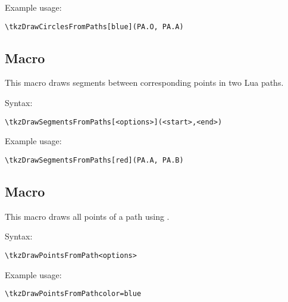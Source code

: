 \noindent
Example usage:

\begin{mybox}
\begin{verbatim}
\tkzDrawCirclesFromPaths[blue](PA.O, PA.A)
\end{verbatim}
\end{mybox}


\subsection{Macro } %
\label{sub:macro_tkzDrawSegmentsFromPaths}

This macro draws segments between corresponding points in two Lua paths.

\medskip
\noindent
Syntax:

\begin{verbatim}
\tkzDrawSegmentsFromPaths[<options>](<start>,<end>)
\end{verbatim}

\noindent
Example usage:

\begin{mybox}
\begin{verbatim}
\tkzDrawSegmentsFromPaths[red](PA.A, PA.B)
\end{verbatim}
\end{mybox}


\subsection{Macro } %
\label{sub:macro_tkzDrawPointsFromPath}

This macro draws all points of a path using .

\medskip
\noindent
Syntax:

\begin{verbatim}
\tkzDrawPointsFromPath<options>
\end{verbatim}

\noindent
Example usage:

\begin{mybox}
\begin{verbatim}
\tkzDrawPointsFromPathcolor=blue
\end{verbatim}
\end{mybox}

